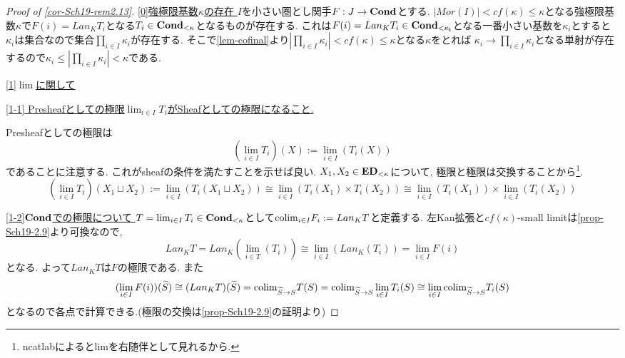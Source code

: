 \documentclass[dvipdfmx,a4paper,11pt]{report}
\newcommand{\colim}{{\rm colim}}
\theoremstyle{definition}
\begin{document}
\begin{proof}[Proof of \ref{cor-Sch19-rem2.13}]

\underline{[0]強極限基数$\kappa$の存在 }
$I$を小さい圏とし関手$F : J \to {\bf Cond}$とする.
$|Mor(I)| < cf(\kappa) \le \kappa$となる強極限基数$\kappa$で$F(i) = Lan_{K}T_i$となる$T_i \in {\bf Cond_{<\kappa}}$となるものが存在する.
これは$F(i) = Lan_{K}T_i \in {\bf Cond_{< \kappa_i}}$となる一番小さい基数を$\kappa_i$とすると
$\kappa_i$は集合なので集合$\prod_{i \in I}\kappa_i$が存在する. 
そこで\ref{lem-cofinal}より$|\prod_{i \in I}\kappa_i| < cf(\kappa) \le \kappa$となる$\kappa$をとれば
$\kappa_i \to \prod_{i \in I}\kappa_i$となる単射が存在するので$\kappa_i \le |\prod_{i \in I}\kappa_i| < \kappa$である. 

\underline{ [1]$\lim$に関して }

\underline{ [1-1] Presheafとしての極限$\lim_{i \in I}T_i$がSheafとしての極限になること.}

Presheafとしての極限は
$$
(\lim_{i \in I}T_i)(X):=\lim_{i \in I}(T_{i}(X))
$$
であることに注意する. これがsheafの条件を満たすことを示せば良い.
$X_1, X_2 \in {\bf ED}_{< \kappa}$について, 極限と極限は交換することから\footnote{ncatlabによるとlimを右随伴として見れるから.}.
$$
(\lim_{i \in I}T_i)(X_1 \sqcup  X_2 ) 
:= \lim_{i \in I}(T_i(X_1\sqcup X_2))
\cong 
\lim_{i \in I}(T_i(X_1)\times T_i( X_2))
\cong
\lim_{i \in I}(T_i(X_1))\times \lim_{i \in I}(T_i( X_2))
$$

 \underline{ [1-2]${\bf Cond}$での極限について }
 $T = \lim_{i \in I}T_i \in {\bf Cond}_{< \kappa}$として$\colim_{i \in I}F_i := Lan_{K}T$と定義する.
 左Kan拡張と$cf(\kappa)$-small limitは\ref{prop-Sch19-2.9}より可換なので, 
 $$
 Lan_{K}T=Lan_K(\lim_{i \in T}(T_i))\cong \lim_{i \in I}(Lan_{K}(T_i))
 =\lim_{i \in I}F(i)
 $$
 となる. よって$ Lan_{K}T$は$F$の極限である. 
  また
 $$
 (\lim_{i \in I}F(i))(\widetilde{S})
 \cong
  (Lan_{K}T)(\widetilde{S})
  =\colim_{\widetilde{S} \to S}T(S)
  =\colim_{\widetilde{S} \to S} \lim_{i \in I}T_i(S)
  \cong
   \lim_{i \in I} \colim_{\widetilde{S} \to S} T_i(S)
 $$
 となるので各点で計算できる.(極限の交換は\ref{prop-Sch19-2.9}の証明より)
 

\end{proof}
\end{document}
